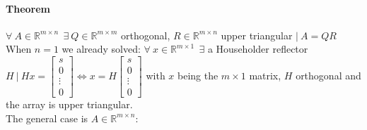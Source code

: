 \documentclass[10pt]{report}
\begin{document}
\paragraph{Theorem} $\forall\:A\in \mathbb{R}^{m\times n}\:\:\exists\:Q\in \mathbb{R}^{m\times m}$ orthogonal, $R\in \mathbb{R}^{m\times n}$ upper triangular $|\:A = QR$\\
When $n = 1$ we already solved: $\forall\:x\in \mathbb{R}^{m\times 1}\:\:\exists$ a Householder reflector $H\:|\:Hx = \left[\begin{array}{c}
s\\0\\\vdots\\0
\end{array}\right] \Leftrightarrow x = H\left[\begin{array}{c}
s\\0\\\vdots\\0
\end{array}\right]$ with $x$ being the $m\times 1$ matrix, $H$ orthogonal and the array is upper triangular.\\
The general case is $A\in \mathbb{R}^{m\times n}$:
\end{document}
